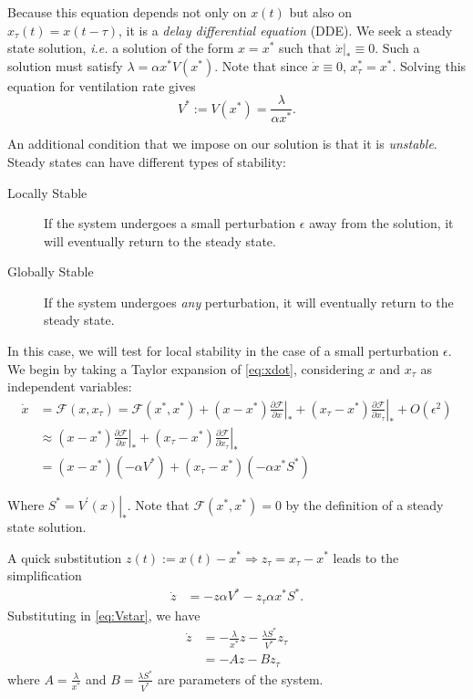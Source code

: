 Because this equation depends not only on $x(t)$ but also on $x_\tau(t) = x(t-\tau)$, it is a \emph{delay differential equation} (DDE). We seek a steady state solution, \emph{i.e.} a solution of the form $x= x^*$ such that $\left.\dot{x}\right|_*\equiv 0$. Such a solution must satisfy $\lambda = \alpha x^*V(x^*)$. Note that since $\dot{x}\equiv0$, $x_\tau^* = x^*$. Solving this equation for ventilation rate gives
\begin{equation}
  V^* := V(x^*) = \frac{\lambda}{\alpha x^*}.
  \label{eq:Vstar}
\end{equation}

An additional condition that we impose on our solution is that it is \emph{unstable}. Steady states can have different types of stability:
\begin{description}
  \item[Locally Stable] If the system undergoes a small perturbation $\epsilon$ away from the solution, it will eventually return to the steady state.
  \item[Globally Stable] If the system undergoes \emph{any} perturbation, it will eventually return to the steady state.
\end{description}

In this case, we will test for local stability in the case of a small perturbation $\epsilon$. We begin by taking a Taylor expansion of \eqref{eq:xdot}, considering $x$ and $x_\tau$ as independent variables:
\begin{align*}
  \dot{x} &= \mathscr{F}(x,x_\tau) = \mathscr{F}(x^*,x^*) + \left. (x-x^*)\frac{\partial{\mathscr{F}}}{\partial{x}} \right|_* + \left. (x_\tau-x^*)\frac{\partial{\mathscr{F}}}{\partial{x_\tau}} \right|_* + O\left( \epsilon^2 \right)\\
  &\approx  \left. (x-x^*)\frac{\partial{\mathscr{F}}}{\partial{x}} \right|_* + \left. (x_\tau-x^*)\frac{\partial{\mathscr{F}}}{\partial{x_\tau}} \right|_*\\
  &=(x-x^*)\left( -\alpha V^* \right) + (x_\tau-x^*)(-\alpha x^*S^*)
\end{align*}

Where $S^* = \left.V^\prime(x)\right|_*$. Note that $\mathscr{F}(x^*,x^*) = 0$ by the definition of a steady state solution. 

A quick substitution $z(t) := x(t)-x^*\Rightarrow z_\tau = x_\tau-x^*$ leads to the simplification
\begin{align*}
  \dot{z} &= -z \alpha V^* - z_\tau \alpha x^* S^*.
\end{align*}
Substituting in \eqref{eq:Vstar}, we have
\begin{align*}
  \dot{z} &= -\frac{\lambda}{x^*}z - \frac{\lambda S^*}{V^*}z_\tau\\
  &=-Az -Bz_\tau
\end{align*}
where $A = \frac{\lambda}{x^*}$ and $B = \frac{\lambda S^*}{V^*}$ are parameters of the system.

